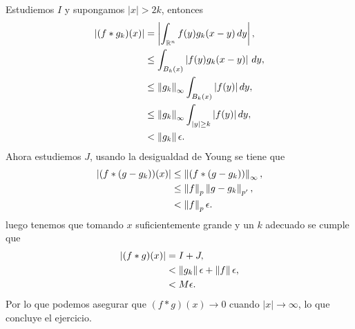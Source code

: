 \begin{homeworkProblem}
\begin{solution}
\begin{enumerate}[(i)]
        Estudiemos $I$ y supongamos $|x|>2k$, entonces 
        \begin{align*}
          \left| (f*g_k)(x) \right|&=\left| \int_{\mathbb{R}^{n}}f(y)g_{k}(x-y)\, dy \right|,\\
          &\leq \int_{B_{k}(x)}\left| f(y)g_{k}(x-y) \right|\, dy,\\
          &\leq \left\|g_k\right\|_{\infty}\int_{B_{k}(x)}|f(y)|\, dy,\\
          &\leq \left\|g_k\right\|_{\infty}\int_{|y|\geq k}|f(y)|\, dy,\\
          &< \left\|g_k\right\|\epsilon.
        \end{align*}
        Ahora estudiemos $J$, usando la desigualdad de Young se tiene que
        \begin{align*}
          \left| (f*(g-g_k))(x) \right|&\leq \left\|(f*(g-g_k))\right\|_{\infty},\\
          &\leq \left\|f\right\|_{p}\left\|g-g_k\right\|_{p'},\\
          &< \left\|f\right\|_{p}\epsilon.
        \end{align*}
        luego tenemos que tomando $x$ suficientemente grande y un $k$ adecuado se cumple que 
        \begin{align*}
          \left| (f*g)(x) \right|&= I+J,\\
          &<\left\|g_k\right\|\epsilon + \left\|f\right\|\epsilon,\\
          &<M\epsilon.
        \end{align*}
        Por lo que podemos asegurar que $(f*g)(x)\to 0$ cuando $|x|\to \infty$, lo que concluye el ejercicio. 
    \end{enumerate}   
  \end{solution}
\end{homeworkProblem}
